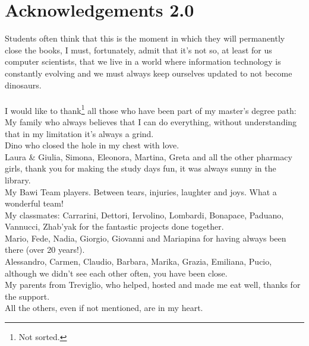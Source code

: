 \chapter*{Acknowledgements 2.0}

Students often think that this is the moment in which they will permanently close the books, I must, fortunately, admit that it's not so, at least for us computer scientists, that we live in a world where information technology is constantly evolving and we must always keep ourselves updated to not become dinosaurs.\\
\\
I would like to thank\footnote{Not sorted.} all those who have been part of my master's degree path:\\
My family who always believes that I can do everything, without understanding that in my limitation it's always a grind.\\
Dino who closed the hole in my chest with love.\\
Laura \& Giulia, Simona, Eleonora, Martina, Greta and all the other pharmacy girls, thank you for making the study days fun, it was always sunny in the library.\\
My Bawi Team players. Between tears, injuries, laughter and joys. What a wonderful team!\\
My classmates: Carrarini, Dettori, Iervolino, Lombardi, Bonapace, Paduano, Vannucci, Zhab'yak for the fantastic projects done together.\\
Mario, Fede, Nadia, Giorgio, Giovanni and Mariapina for having always been there (over 20 years!).\\
Alessandro, Carmen, Claudio, Barbara, Marika, Grazia, Emiliana, Pucio, although we didn't see each other often, you have been close.\\
My parents from Treviglio, who helped, hosted and made me eat well, thanks for the support.\\
All the others, even if not mentioned, are in my heart.